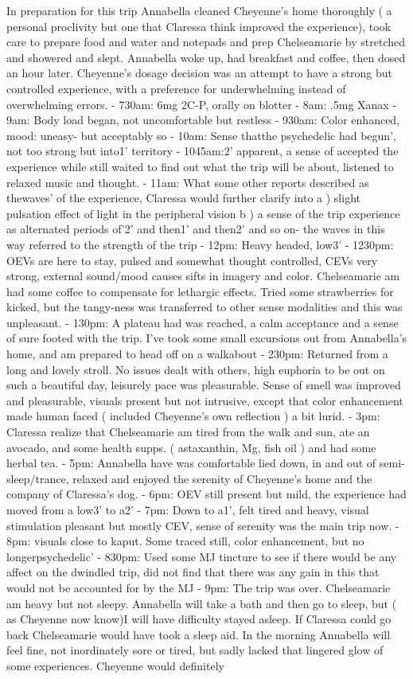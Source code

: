 \documentclass[12pt]{book}
\begin{document}
In preparation for this trip Annabella cleaned Cheyenne's home thoroughly ( a personal proclivity but one that Claressa think improved the experience), took care to prepare food and water and notepads and prep Chelseamarie by stretched and showered and slept. Annabella woke up, had breakfast and coffee, then dosed an hour later. Cheyenne's dosage decision was an attempt to have a strong but controlled experience, with a preference for underwhelming instead of overwhelming errors. - 730am: 6mg 2C-P, orally on blotter - 8am: .5mg Xanax - 9am: Body load began, not uncomfortable but restless - 930am: Color enhanced, mood: uneasy- but acceptably so - 10am: Sense thatthe psychedelic had begun', not too strong but into1' territory - 1045am:2' apparent, a sense of accepted the experience while still waited to find out what the trip will be about, listened to relaxed music and thought. - 11am: What some other reports described as thewaves' of the experience, Claressa would further clarify into a ) slight pulsation effect of light in the peripheral vision b ) a sense of the trip experience as alternated periods of'2' and then1' and then2' and so on- the waves in this way referred to the strength of the trip - 12pm: Heavy headed, low3' - 1230pm: OEVs are here to stay, pulsed and somewhat thought controlled, CEVs very strong, external sound/mood causes sifts in imagery and color. Chelseamarie am had some coffee to compensate for lethargic effects. Tried some strawberries for kicked, but the tangy-ness was transferred to other sense modalities and this was unpleasant. - 130pm: A plateau had was reached, a calm acceptance and a sense of sure footed with the trip. I've took some small excursions out from Annabella's home, and am prepared to head off on a walkabout - 230pm: Returned from a long and lovely stroll. No issues dealt with others, high euphoria to be out on such a beautiful day, leisurely pace was pleasurable. Sense of smell was improved and pleasurable, visuals present but not intrusive, except that color enhancement made human faced ( included Cheyenne's own reflection ) a bit lurid. - 3pm: Claressa realize that Chelseamarie am tired from the walk and sun, ate  an avocado, and some health supps. ( astaxanthin, Mg, fish oil ) and had some herbal tea. - 5pm: Annabella have was comfortable lied down, in and out of semi-sleep/trance, relaxed and enjoyed the serenity of Cheyenne's home and the company of Claressa's dog. - 6pm: OEV still present but mild, the experience had moved from a low3' to a2' - 7pm: Down to a1', felt tired and heavy, visual stimulation pleasant but mostly CEV, sense of serenity was the main trip now. - 8pm: visuals close to kaput. Some traced still, color enhancement, but no longerpsychedelic' - 830pm: Used some MJ tincture to see if there would be any affect on the dwindled trip, did not find that there was any gain in this that would not be accounted for by the MJ - 9pm: The trip was over. Chelseamarie am heavy but not sleepy. Annabella will take a bath and then go to sleep, but ( as Cheyenne now know)I will have difficulty stayed asleep. If Claressa could go back Chelseamarie would have took a sleep aid. In the morning Annabella will feel fine, not inordinately sore or tired, but sadly lacked that lingered glow of some experiences. Cheyenne would definitely 
\end{document}
